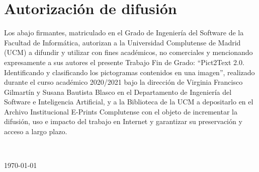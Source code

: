 
\chapter*{Autorizaci\'{o}n de difusi\'{o}n}

   
Los abajo firmantes, matriculado en el Grado de Ingenier\'{i}a del Software de la Facultad de Inform\'{a}tica, autorizan a la Universidad Complutense de Madrid (UCM) a difundir y utilizar con fines acad\'{e}micos, no comerciales y mencionando expresamente a sus autores el presente Trabajo Fin de Grado: ``Pict2Text 2.0. Identificando y clasificando los pictogramas contenidos en una imagen'', realizado durante el curso acad\'{e}mico 2020/2021 bajo la direcci\'{o}n de Virginia Francisco Gilmart\'{i}n y Susana Bautista Blasco en el Departamento de Ingenier\'{i}a del Software e Inteligencia Artificial, y a la Biblioteca de la UCM a depositarlo en el Archivo Institucional E-Prints Complutense con el objeto de incrementar la difusi\'{o}n, uso e impacto del trabajo en Internet y garantizar su preservaci\'{o}n y acceso a largo plazo.

\vspace{5cm}

\begin{center}
	\large \autorA  \hspace{2cm}  \autorB\\
	
	\vspace{0.5cm}
	
	
	\today\\
	
\end{center}

